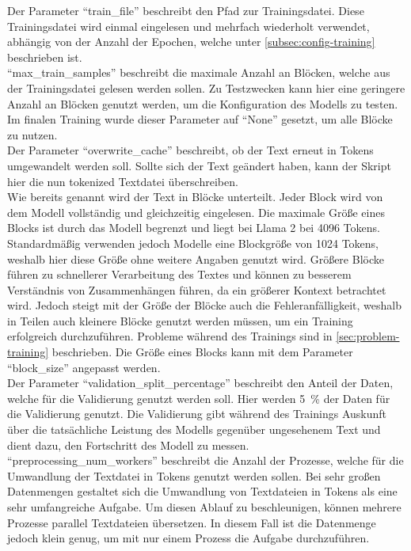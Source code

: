 Der Parameter \enquote{train\_file} beschreibt den Pfad zur Trainingsdatei.
Diese Trainingsdatei wird einmal eingelesen und mehrfach wiederholt verwendet, abhängig von der Anzahl der Epochen, welche unter \cref{subsec:config-training} beschrieben ist.\\

\enquote{max\_train\_samples} beschreibt die maximale Anzahl an Blöcken, welche aus der Trainingsdatei gelesen werden sollen.
Zu Testzwecken kann hier eine geringere Anzahl an Blöcken genutzt werden, um die Konfiguration des Modells zu testen.
Im finalen Training wurde dieser Parameter auf \enquote{None} gesetzt, um alle Blöcke zu nutzen.\\

Der Parameter \enquote{overwrite\_cache} beschreibt, ob der Text erneut in Tokens umgewandelt werden soll.
Sollte sich der Text geändert haben, kann der Skript hier die nun tokenized Textdatei überschreiben.\\

Wie bereits genannt wird der Text in Blöcke unterteilt.
Jeder Block wird von dem Modell vollständig und gleichzeitig eingelesen.
Die maximale Größe eines Blocks ist durch das Modell begrenzt und liegt bei Llama 2 bei 4096 Tokens.
Standardmäßig verwenden jedoch Modelle eine Blockgröße von 1024 Tokens, weshalb hier diese Größe ohne weitere Angaben genutzt wird.
Größere Blöcke führen zu schnellerer Verarbeitung des Textes und können zu besserem Verständnis von Zusammenhängen führen, da ein größerer Kontext betrachtet wird.
Jedoch steigt mit der Größe der Blöcke auch die Fehleranfälligkeit, weshalb in Teilen auch kleinere Blöcke genutzt werden müssen, um ein Training erfolgreich durchzuführen.
Probleme während des Trainings sind in \cref{sec:problem-training} beschrieben.
Die Größe eines Blocks kann mit dem Parameter \enquote{block\_size} angepasst werden.\\

Der Parameter \enquote{validation\_split\_percentage} beschreibt den Anteil der Daten, welche für die Validierung genutzt werden soll.
Hier werden \SI{5}{\percent} der Daten für die Validierung genutzt.
Die Validierung gibt während des Trainings Auskunft über die tatsächliche Leistung des Modells gegenüber ungesehenem Text und dient dazu, den Fortschritt des Modell zu messen.\\

\enquote{preprocessing\_num\_workers} beschreibt die Anzahl der Prozesse, welche für die Umwandlung der Textdatei in Tokens genutzt werden sollen.
Bei sehr großen Datenmengen gestaltet sich die Umwandlung von Textdateien in Tokens als eine sehr umfangreiche Aufgabe.
Um diesen Ablauf zu beschleunigen, können mehrere Prozesse parallel Textdateien übersetzen.
In diesem Fall ist die Datenmenge jedoch klein genug, um mit nur einem Prozess die Aufgabe durchzuführen.\\


